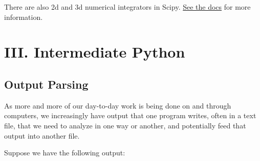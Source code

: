 \documentclass[11pt]{article}
\begin{document}
    There are also 2d and 3d numerical integrators in Scipy.
\href{http://docs.scipy.org/doc/scipy/reference/integrate.html}{See the
docs} for more information.

    \section{III. Intermediate Python}\label{iii.-intermediate-python}

\subsection{Output Parsing}\label{output-parsing}

As more and more of our day-to-day work is being done on and through
computers, we increasingly have output that one program writes, often in
a text file, that we need to analyze in one way or another, and
potentially feed that output into another file.

Suppose we have the following output:
\end{document}
